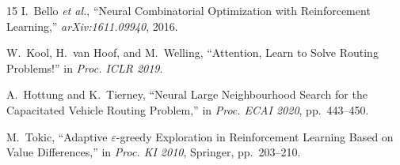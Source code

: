 \documentclass[10pt,twocolumn]{article}
\begin{document}
\begin{thebibliography}{15}
I.~Bello \textit{et al.},
``Neural Combinatorial Optimization with Reinforcement Learning,''
\textit{arXiv:1611.09940}, 2016.

W.~Kool, H.~van Hoof, and M.~Welling,
``Attention, Learn to Solve Routing Problems!''
in \textit{Proc. ICLR 2019}.

A.~Hottung and K.~Tierney,
``Neural Large Neighbourhood Search for the Capacitated Vehicle Routing Problem,''
in \textit{Proc. ECAI 2020}, pp.~443--450.

M.~Tokic,
``Adaptive $\varepsilon$-greedy Exploration in Reinforcement Learning Based on
Value Differences,''
in \textit{Proc. KI 2010}, Springer, pp.~203--210.

\end{thebibliography}
\end{document}
